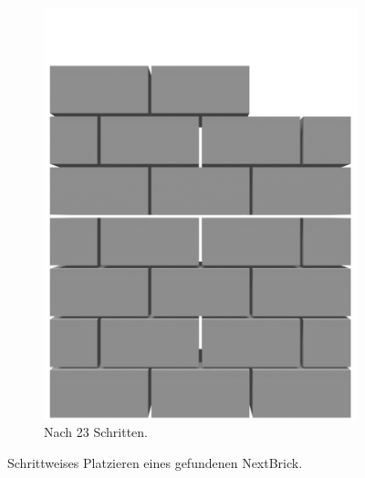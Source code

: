 \begin{figure}[hb!]
\begin{subfigure}[b]{0.3\columnwidth}
    \includegraphics[width=\columnwidth]{fig/scenario4_output_23_render.png}
    \caption{Nach 23 Schritten.}
  \end{subfigure}
  \caption{Schrittweises Platzieren eines gefundenen NextBrick.}\label{fig:poc:result_scenario4}
\end{figure}
\newpage
